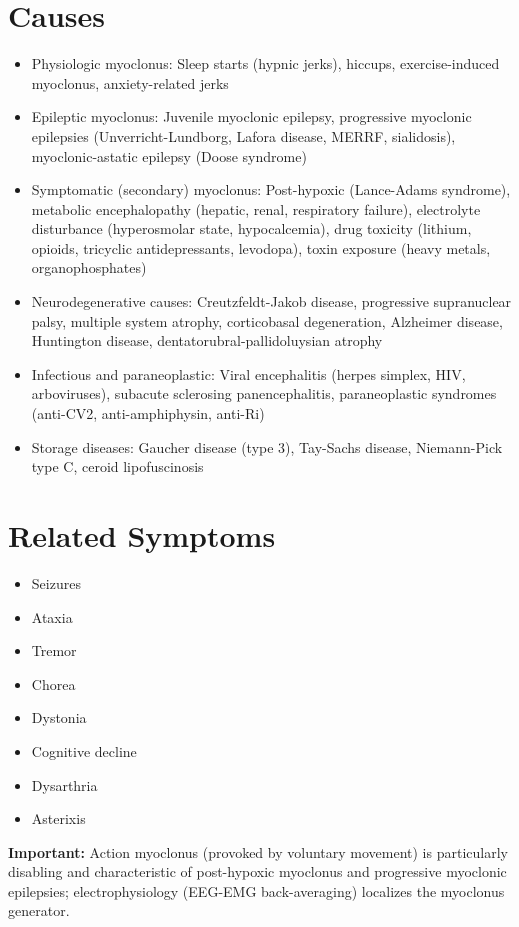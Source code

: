 \section*{Causes}
\begin{itemize}
  \item Physiologic myoclonus: Sleep starts (hypnic jerks), hiccups, exercise-induced myoclonus, anxiety-related jerks
  \item Epileptic myoclonus: Juvenile myoclonic epilepsy, progressive myoclonic epilepsies (Unverricht-Lundborg, Lafora disease, MERRF, sialidosis), myoclonic-astatic epilepsy (Doose syndrome)
  \item Symptomatic (secondary) myoclonus: Post-hypoxic (Lance-Adams syndrome), metabolic encephalopathy (hepatic, renal, respiratory failure), electrolyte disturbance (hyperosmolar state, hypocalcemia), drug toxicity (lithium, opioids, tricyclic antidepressants, levodopa), toxin exposure (heavy metals, organophosphates)
  \item Neurodegenerative causes: Creutzfeldt-Jakob disease, progressive supranuclear palsy, multiple system atrophy, corticobasal degeneration, Alzheimer disease, Huntington disease, dentatorubral-pallidoluysian atrophy
  \item Infectious and paraneoplastic: Viral encephalitis (herpes simplex, HIV, arboviruses), subacute sclerosing panencephalitis, paraneoplastic syndromes (anti-CV2, anti-amphiphysin, anti-Ri)
  \item Storage diseases: Gaucher disease (type 3), Tay-Sachs disease, Niemann-Pick type C, ceroid lipofuscinosis
\end{itemize}

\section*{Related Symptoms}
\begin{itemize}
  \item Seizures
  \item Ataxia
  \item Tremor
  \item Chorea
  \item Dystonia
  \item Cognitive decline
  \item Dysarthria
  \item Asterixis
\end{itemize}
\textbf{Important:} Action myoclonus (provoked by voluntary movement) is particularly disabling and characteristic of post-hypoxic myoclonus and progressive myoclonic epilepsies; electrophysiology (EEG-EMG back-averaging) localizes the myoclonus generator.

